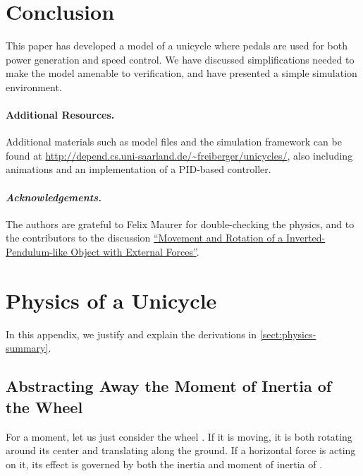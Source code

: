 \documentclass[copyright,submission]{eptcs}
\begin{document}
\section{Conclusion}\label{sect:conclusion}
This paper has developed a model of a unicycle where pedals are used
for both power generation and speed control. We have discussed
simplifications needed to make the model amenable to verification, and
have presented a simple simulation environment.

\paragraph{Additional Resources.} Additional materials such as model files and the simulation framework can be found at \mbox{\url{http://depend.cs.uni-saarland.de/~freiberger/unicycles/}}, also including animations and an implementation of a PID-based controller.

\paragraph{\textit{Acknowledgements.}} The authors are grateful to  Felix Maurer for  double-checking the physics, and to the contributors to the discussion \href{http://physics.stackexchange.com/questions/179622/movement-and-rotation-of-a-inverted-pendulum-like-object-with-external-forces}{``Movement and Rotation of a Inverted-Pendulum-like Object with External Forces''}.






\clearpage\appendix


\section{Physics of a Unicycle}\label{sect:physics}

In this appendix, we justify and explain the derivations in \cref{sect:physics-summary}.


\subsection{Abstracting Away the Moment of Inertia of the Wheel}\label{sect:abstractinginertia}

For a moment, let us just consider the wheel . If it is moving, it is both rotating around its center and translating along the ground. If a horizontal force  is acting on it, its effect is governed by both the inertia and moment of inertia of .
\end{document}
